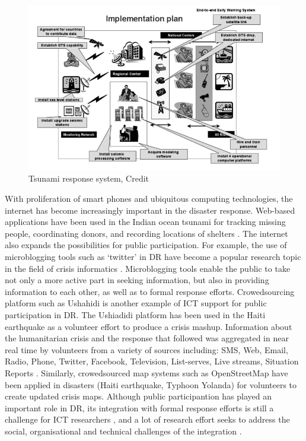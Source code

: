 \begin{figure}[h]
  \centering
  \includegraphics[width=1\textwidth]{img/Background/ICTExample}
  \caption{Tsunami response system, Credit \cite{Wattegama2012} }
  \label{fig:ICTExample}
\end{figure}

With proliferation of smart phones and ubiquitous computing technologies, the internet has become increasingly important in the disaster response. Web-based applications have been used in the Indian ocean tsunami for tracking missing people, coordinating donors, and recording locations of shelters \citep{Wattegama2012}. The internet also expands the possibilities for public participation. For example, the use of microblogging tools such as `twitter' in \ac{DR} have become a popular research topic in the field of crisis informatics \citep{Kogan2012,Sarcevic2012,Starbird2010}.  Microblogging tools enable the public to take not only a more active part in seeking information, but also in providing information to each other, as well as to formal response efforts. Crowedsourcing platform such as Ushahidi \citep{Morrow2011} is another example of \ac{ICT} support for public participation in \ac{DR}. The Ushiadidi platform has been used in the Haiti earthquake as a volunteer effort to produce a crisis mashup. Information about the humanitarian crisis and the response that followed was aggregated in near real time by volunteers from a variety of sources including: SMS, Web, Email, Radio, Phone, Twitter, Facebook, Television, List-serves, Live streams, Situation Reports \citep{Morrow2011}. Similarly, crowedsourced map systems such as OpenStreetMap \citep{Palen2015} have been applied in disasters (Haiti earthquake, Typhoon Yolanda) for volunteers to create updated crisis maps. Although public participantion has played an important role in \ac{DR}, its integration with formal response efforts is still a challenge for \ac{ICT} researchers \citep{Palen2007}, and a lot of research effort seeks to address the social, organisational and technical challenges of the integration \citep{Dashti2014,Sutton2008}.   \\

